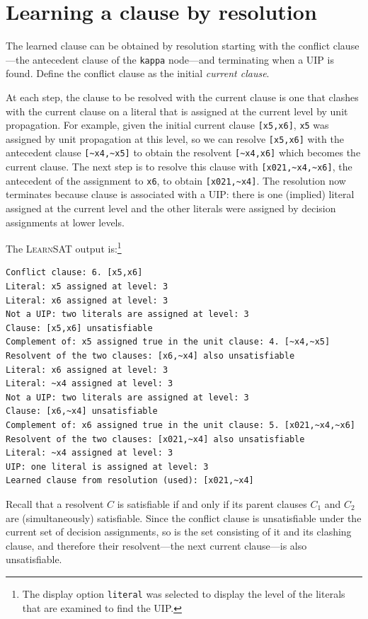 \documentclass[11pt]{article}
\newcommand*{\p}[1]{\textup{\texttt{#1}}}
\newcommand*{\ls}{\textsc{LearnSAT}}
\begin{document}
\newpage

\section{Learning a clause by resolution}\label{learned.res}

The learned clause can be obtained by resolution starting with the
conflict clause---the antecedent clause of the \p{kappa} node---and
terminating when a UIP is found. Define the conflict clause as the
initial \emph{current clause}.

At each step, the clause to be resolved with the current clause is one
that clashes with the current clause on a literal that is assigned at
the current level by unit propagation. For example, given the initial
current clause \verb+[x5,x6]+, \p{x5} was assigned by unit propagation
at this level, so we can resolve \verb+[x5,x6]+ with the antecedent
clause \verb+[~x4,~x5]+ to obtain the resolvent \verb+[~x4,x6]+ which
becomes the current clause. The next step is to resolve this clause with
\verb+[x021,~x4,~x6]+, the antecedent of the assignment to \p{x6}, to
obtain \verb+[x021,~x4]+. The resolution now terminates because clause
is associated with a UIP: there is one (implied) literal assigned at the
current level and the other literals were assigned by decision
assignments at lower levels.

The \ls{} output is:\footnote{The display option \p{literal} was
selected to display the level of the literals that are examined to find
the UIP.}

\begin{verbatim}
Conflict clause: 6. [x5,x6]
Literal: x5 assigned at level: 3
Literal: x6 assigned at level: 3
Not a UIP: two literals are assigned at level: 3
Clause: [x5,x6] unsatisfiable
Complement of: x5 assigned true in the unit clause: 4. [~x4,~x5]
Resolvent of the two clauses: [x6,~x4] also unsatisfiable
Literal: x6 assigned at level: 3
Literal: ~x4 assigned at level: 3
Not a UIP: two literals are assigned at level: 3
Clause: [x6,~x4] unsatisfiable
Complement of: x6 assigned true in the unit clause: 5. [x021,~x4,~x6]
Resolvent of the two clauses: [x021,~x4] also unsatisfiable
Literal: ~x4 assigned at level: 3
UIP: one literal is assigned at level: 3
Learned clause from resolution (used): [x021,~x4]
\end{verbatim}

Recall \cite[Theorem~4.17]{mlcs} that a resolvent $C$ is satisfiable if
and only if its parent clauses $C_1$ and $C_2$ are (simultaneously)
satisfiable. Since the conflict clause is unsatisfiable under the
current set of decision assignments, so is the set consisting of it and
its clashing clause, and therefore their resolvent---the next current
clause---is also unsatisfiable.
\end{document}
